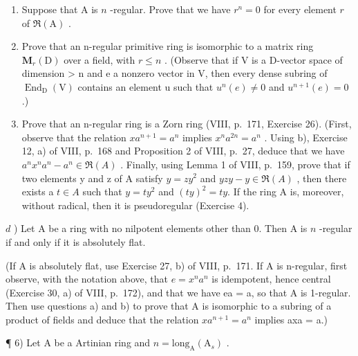 \begin{enumerate}
\def\labelenumi{\alph{enumi})}
\item
  Suppose that \(\mathrm{A}\) is \(n\) -regular. Prove that we have \(r^n = 0\) for every element \(r\) of \(\Re(\mathrm{A})\) .
\item
  Prove that an n-regular primitive ring is isomorphic to a matrix ring \(\mathbf{M}_{r}(\mathrm{D})\) over a field, with \(r \leqslant n\) . (Observe that if V is a D-vector space of dimension \textgreater{} n and e a nonzero vector in V, then every dense subring of \(\operatorname{End}_{\mathrm{D}}(\mathrm{V})\) contains an element u such that \(u^{n}(e) \neq 0\) and \(u^{n+1}(e) = 0\) .)
\item
  Prove that an n-regular ring is a Zorn ring (VIII, p.~171, Exercise 26). (First, observe that the relation \(xa^{n+1}=a^{n}\) implies \(x^{n}a^{2n}=a^{n}\) . Using b), Exercise 12, a) of VIII, p.~168 and Proposition 2 of VIII, p.~27, deduce that we have \(a^{n}x^{n}a^{n}-a^{n}\in\Re(A)\) . Finally, using Lemma 1 of VIII, p.~159, prove that if two elements y and z of A satisfy \(y=zy^{2}\) and \(yzy-y\in\Re(A)\) , then there exists a \(t\in A\) such that \(y=ty^{2}\) and \((ty)^{2}=ty.\) If the ring A is, moreover, without radical, then it is pseudoregular (Exercise 4).
\end{enumerate}

\(d\) ) Let A be a ring with no nilpotent elements other than 0. Then A is \(n\) -regular if and only if it is absolutely flat.

(If A is absolutely flat, use Exercise 27, b) of VIII, p.~171. If A is n-regular, first observe, with the notation above, that \(e = x^{n}a^{n}\) is idempotent, hence central (Exercise 30, a) of VIII, p.~172), and that we have ea = a, so that A is 1-regular. Then use questions a) and b) to prove that A is isomorphic to a subring of a product of fields and deduce that the relation \(xa^{n+1} = a^{n}\) implies axa = a.)

¶ 6) Let A be a Artinian ring and \(n = \text{long}_{\text{A}}(\text{A}_s)\) .

